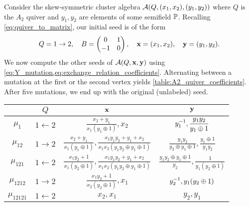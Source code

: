\begin{example}

	Consider the skew-symmetric cluster algebra $\mathcal{A}(Q, (x_1, x_2), (y_1, y_2))$ where $Q$
	is the $A_2$ quiver and $y_1, y_2$ are elements of some semifield $\mathbb{P}$. Recalling \cref{eq:quiver_to_matrix}, our
	initial seed is of the form
	\begin{equation*}
		Q = 1 \to 2, \quad B = \begin{pmatrix}
			0 &1\\
			-1 & 0
		\end{pmatrix}, \quad \mathbf{x} = (x_1, x_2), \quad \mathbf{y} = (y_1, y_2).
	\end{equation*}
	We now compute the other seeds of $\mathcal{A}(Q, \mathbf{x}, \mathbf{y})$ using \cref{eq:Y_mutation,eq:exchange_relation_coefficients}. Alternating between a mutation
	at the first or the second vertex yields \cref{table:A2_quiver_coefficients}. After
	five mutations, we end up with the original (unlabeled) seed.
	\begin{table}[ht!]
		\centering
		\bgroup
		\renewcommand{\arraystretch}{2.5}
		\begin{tabular}{c|c|c|c}
			              & $\displaystyle Q$         & $\displaystyle \mathbf{x}$                                                                                                     & $\displaystyle \mathbf{y}$                                                                \\
			\hline
			$\mu_1$       & $\displaystyle 1 \gets 2$ & $\displaystyle \frac{x_2 + y_1}{x_1(y_1 \oplus 1)}, x_2$                                                                & $\displaystyle y_1^{-1}, \frac{y_1y_2}{y_1 \oplus 1}$                               \\[5pt]
			\hline
			$\mu_{12}$    & $\displaystyle 1 \to 2$   & $\displaystyle \frac{x_2 + y_1}{x_1(y_1 \oplus 1)}, \frac{x_1 y_1 y_2 + y_1 + x_2}{x_1x_2(y_1y_2\oplus y_1 \oplus 1)}$  & $\displaystyle \frac{y_1y_2}{y_2\oplus y_1\oplus 1}, \frac{y_1 \oplus 1}{y_1 y_2}$ \\[5pt]
			\hline
			$\mu_{121}$   & $\displaystyle 1 \gets 2$ & $\displaystyle \frac{x_1y_2 + 1}{x_1(y_2 \oplus 1)}, \frac{x_1 y_1 y_2 + y_1 + x_2}{x_1x_2(y_1y_2\oplus y_1 \oplus 1)}$ & $\displaystyle \frac{y_1y_2\oplus y_1\oplus 1}{y_2}, \frac{1}{y_1(y_2 \oplus 1)}$  \\[5pt]
			\hline
			$\mu_{1212}$  & $\displaystyle 1 \to 2$   & $\displaystyle \frac{x_1y_2 + 1}{x_2(y_2 \oplus 1)},x_1$                                                                & $\displaystyle y_2^{-1}, y_1(y_2 \oplus 1)$                                         \\[5pt]
			\hline
			$\mu_{12121}$ & $\displaystyle 1 \gets 2$ & $\displaystyle x_2,x_1$                                                                                                 & $\displaystyle y_2, y_1$
		\end{tabular}
		\egroup


\end{table}
\end{example}
